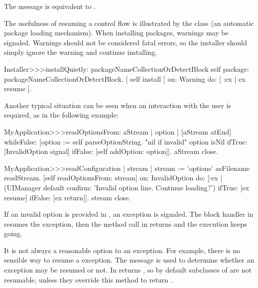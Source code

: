 \documentclass[a4paper,10pt,twoside]{book}
\begin{document}
The message  is equivalent to .

The usefulness of resuming a control flow is illustrated by the class  (an automatic package loading mechanism). When installing packages, warnings may be signaled. Warnings should not be considered fatal errors, so the installer should simply ignore the warning and continue installing.

\begin{code}{}
Installer>>>installQuietly: packageNameCollectionOrDetectBlock 
	self package: packageNameCollectionOrDetectBlock. 
	 [ self install ] on: Warning do: [ :ex | ex resume ]. 
\end{code}

Another typical situation can be seen when an interaction with the user is required, as in the following example:
\begin{code}{}
MyApplication>>>readOptionsFrom: aStream 
	| option |
	[aStream atEnd] whileFalse: 	
		[option := self parseOptionString. "nil if invalid" 
		option isNil 
			ifTrue: [InvalidOption signal] 
			ifFalse: [self addOption: option]]. 
	aStream close. 

 MyApplication>>>readConfiguration 
	| stream | 
	stream := 'options' asFilename readStream. 
	[self readOptionsFrom: stream] 
		on: InvalidOption 
		do: [:ex |
			(UIManager default confirm: 'Invalid option line. Continue loading?') 
				ifTrue: [ex resume] 
				ifFalse: [ex return]]. 
		stream close. 
\end{code}

If an invalid option is provided in , an  exception is signaled. The block handler in  resumes the exception, then the  method call in  returns and the execution keeps going.

It is not always a reasonable option to  an exception. For example, there is no sensible way to resume a  exception. The message  is used to determine whether an exception may be resumed or not. In  returns , so by default subclasses of  are not resumable, unless they override this method to return .

\end{document}
